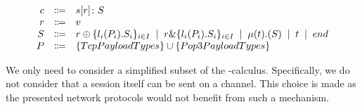\documentclass{article}
\newcommand{\sep}{\;\mid\;}
\begin{document}
\[
\begin{array}{rcl}
  \ensuremath{c}
    & \Coloneq & \ensuremath{s[r] \colon S} \cr
  \ensuremath{r}
    & \Coloneq & \ensuremath{v} \cr
  \ensuremath{S}
    & \Coloneqq & \ensuremath{r \oplus \{l_i(P_i).S_i\}_{i \in I}}
    \sep        \ensuremath{r \& \{l_i(P_i).S_i\}_{i \in I}}
    \sep        \ensuremath{\mu(t).(S)}
    \sep        \ensuremath{t}
    \sep        \ensuremath{end} \cr
  \ensuremath{P}
    & \Coloneq & \ensuremath{\{TcpPayloadTypes\} \cup \{Pop3PayloadTypes\}}
\end{array}
\]

We only need to consider a simplified subset of the \pi-calculus.
Specifically, we do not consider that a session itself can be sent on a channel.
This choice is made as the presented network protocols would not benefit from such a mechanism.

\medskip
\nocite{*}
\printbibliography
\end{document}
